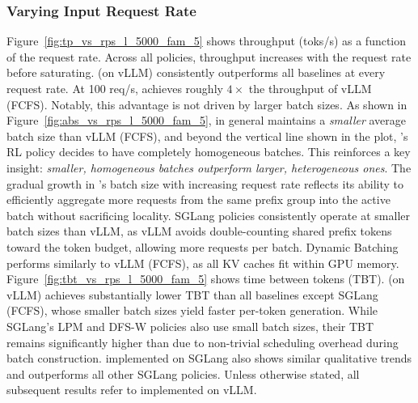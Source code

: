 \subsubsection*{Varying Input Request Rate}
Figure~\ref{fig:tp_vs_rps_l_5000_fam_5} shows throughput (toks/s) as a function of the request rate. Across all policies, throughput increases with the request rate before saturating. \Feather (on vLLM) consistently outperforms all baselines at every request rate. At 100 req/s, \Feather achieves roughly $4\times$ the throughput of vLLM (FCFS). Notably, this advantage is not driven by larger batch sizes. As shown in Figure~\ref{fig:abs_vs_rps_l_5000_fam_5}, \Feather in general maintains a \textit{smaller} average batch size than vLLM (FCFS), and beyond the vertical line shown in the plot, \Feather's RL policy decides to have completely homogeneous batches. This reinforces a key insight: \textit{smaller, homogeneous batches outperform larger, heterogeneous ones}. The gradual growth in \Feather's batch size with increasing request rate reflects its ability to efficiently aggregate more requests from the same prefix group into the active batch without sacrificing locality. SGLang policies consistently operate at smaller batch sizes than vLLM, as vLLM avoids double-counting shared prefix tokens toward the token budget, allowing more requests per batch. Dynamic Batching performs similarly to vLLM (FCFS), as all KV caches fit within GPU memory. Figure~\ref{fig:tbt_vs_rps_l_5000_fam_5} shows time between tokens (TBT). \Feather (on vLLM) achieves substantially lower TBT than all baselines except SGLang (FCFS), whose smaller batch sizes yield faster per-token generation. While SGLang's LPM and DFS-W policies also use small batch sizes, their TBT remains significantly higher than \Feather due to non-trivial scheduling overhead during batch construction.  \Feather implemented on SGLang also shows similar qualitative trends and outperforms all other SGLang policies. Unless otherwise stated, all subsequent results refer to \Feather implemented on vLLM.

\vspace{-5pt}

